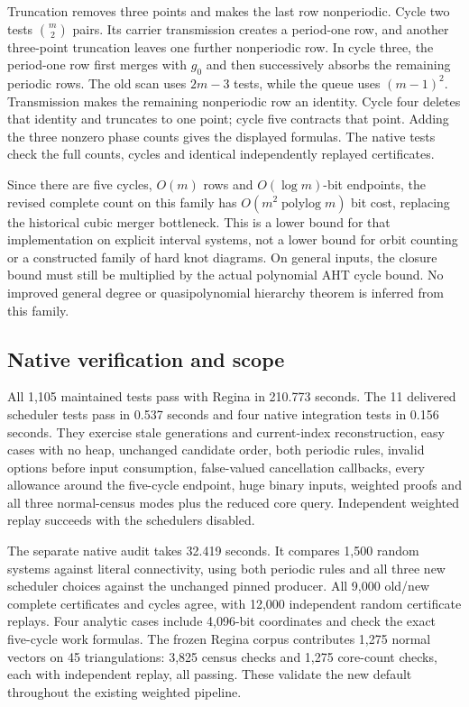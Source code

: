 Truncation removes three points and makes the last row nonperiodic.
Cycle two tests $\binom m2$ pairs. Its carrier transmission creates a
period-one row, and another three-point truncation leaves one further
nonperiodic row. In cycle three, the period-one row first merges with $g_0$
and then successively absorbs the remaining periodic rows. The old scan uses
$2m-3$ tests, while the queue uses $(m-1)^2$. Transmission makes the remaining
nonperiodic row an identity. Cycle four deletes that identity and truncates
to one point; cycle five contracts that point. Adding the three nonzero
phase counts gives the displayed formulas. The native tests check the full
counts, cycles and identical independently replayed certificates.

Since there are five cycles, $O(m)$ rows and $O(\log m)$-bit endpoints,
the revised complete count on this family has $O(m^2\operatorname{polylog}m)$
bit cost, replacing the historical cubic merger bottleneck. This is a lower
bound for that implementation on explicit interval systems, not a lower bound
for orbit counting or a constructed family of hard knot diagrams. On general
inputs, the closure bound must still be multiplied by the actual polynomial
AHT cycle bound. No improved general degree or quasipolynomial hierarchy theorem
is inferred from this family.

\subsection{Native verification and scope}

All 1,105 maintained tests pass with Regina in 210.773 seconds. The 11 delivered
scheduler tests pass in 0.537 seconds and four native integration tests in
0.156 seconds. They exercise stale generations and current-index reconstruction,
easy cases with no heap, unchanged candidate order, both periodic rules,
invalid options before input consumption, false-valued cancellation callbacks,
every allowance around the five-cycle endpoint, huge binary inputs, weighted
proofs and all three normal-census modes plus the reduced core query.
Independent weighted replay succeeds with the schedulers disabled.

The separate native audit takes 32.419 seconds. It compares 1,500 random
systems against literal connectivity, using both periodic rules and all three
new scheduler choices against the unchanged pinned producer. All 9,000
old/new complete certificates and cycles agree, with 12,000 independent random
certificate replays. Four analytic cases include 4,096-bit coordinates and
check the exact five-cycle work formulas. The frozen Regina corpus contributes
1,275 normal vectors on 45 triangulations: 3,825 census checks and 1,275
core-count checks, each with independent replay, all passing. These validate
the new default throughout the existing weighted pipeline.

